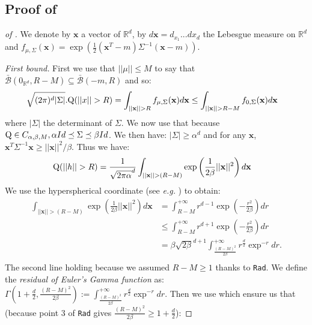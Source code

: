 \begin{noaddcontents}
\subsection{Proof of }
\label{sec: proof_gaussian_tail}

\begin{proof}[of ]
We denote by $\mathbf{x}$ a vector of $\mathbb{R}^d$, by $d\mathbf{x}= d_{x_1}...dx_{d}$ the Lebesgue measure on $\mathbb{R}^d$ and $f_{\mu,\Sigma}(\mathbf{x})= \exp\left(\frac{1}{2}(\mathbf{x}^T-m) \Sigma^{-1} (\mathbf{x}-m)  \right)$.

\textit{First bound.}
First we use that $||\mu||\leq M$ to say that $\bar{\mathcal{B}}(0_{\mathbb{R}^d}, R-M) \subseteq \bar{\mathcal{B}}(-m, R) $ and so:
\begin{align*}
\sqrt{(2 \pi)^d|\Sigma|}.\Q(||x||> R) & = \int_{||\mathbf{x}||> R} f_{\mu,\Sigma}(\mathbf{x})d\mathbf{x} \leq  \int_{||\mathbf{x}||> R- M} f_{0,\Sigma}(\mathbf{x})d\mathbf{x}
\end{align*}
where $ |\Sigma|$ the determinant of $\Sigma$.
We now use that because $\mathrm{Q}\in C_{\alpha,\beta, M}, \alpha Id \preceq \Sigma \preceq \beta Id$. We then have: $|\Sigma|\geq \alpha^d$ and for any $\mathbf{x}$, $\mathbf{x}^T \Sigma^{-1} \mathbf{x} \geq ||\mathbf{x}||^2/\beta.$
Thus we have:
\begin{align*}
\Q(||h||>R) & = \frac{1}{\sqrt{2 \pi\alpha}^{d}}\int_{||\mathbf{x}||>(R-M)} \exp\left(\frac{1}{2\beta}||\mathbf{x}||^2  \right) d \mathbf{x}
\end{align*}
We use the hyperspherical coordinate (see \emph{e.g.} \citealp{blumenson1960derivation}) to obtain:
\begin{align*}
\int_{||\mathbf{x}||>(R-M)} \exp\left(\frac{1}{2\beta}||\mathbf{x}||^2  \right) d \mathbf{x} &= \int_{R-M}^{+\infty} r^{d-1} \exp\left(- \frac{r^2}{2\beta}\right)dr\\
& \leq \int_{R-M}^{+\infty} r^{d+1} \exp\left(- \frac{r^2}{2\beta}\right)dr \\
&= \beta\sqrt{2\beta}^{d+1} \int_{\frac{(R-M)^2}{2\beta}}^{+\infty} r^{\frac{d}{2}} \exp^{-r}dr.\\
\end{align*}
The second line holding because we assumed $R-M\geq 1$ thanks to \texttt{Rad}. We define the \emph{residual of Euler's Gamma function} as:   $\Gamma\left(1+\frac{d}{2}, \frac{(R-M)^2}{2\beta}\right):= \int_{\frac{(R-M)^2}{2\beta}}^{+\infty} r^{\frac{d}{2}} \exp^{-r}dr$.
Then we use \citet[Lemma 4.4.3, p.84]{gabcke1979neue} which ensure us that (because point 3 of \texttt{Rad} gives $\frac{(R-M)^2}{2\beta}\geq 1+\frac{d}{2}$):

\end{proof}
\end{noaddcontents}
